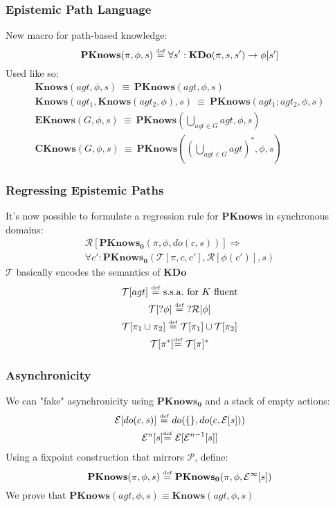 \documentclass{beamer}
\newcommand{\isdef}{\hbox{$\stackrel{\mbox{\tiny def}}{=}$}}
\newcommand{\Reg}{\mathcal{R}}
\newcommand{\Pst}{\mathcal{P}}
\newcommand{\Trn}{\mathcal{T}}
\begin{document}
\begin{frame}
\frametitle{Epistemic Path Language}
New macro for path-based knowledge:
\begin{equation*}
\mathbf{PKnows}(\pi,\phi,s)\ \isdef\ \forall s': \mathbf{KDo}(\pi,s,s') \rightarrow \phi[s']
\end{equation*}
Used like so:
\begin{gather*}
\mathbf{Knows}(agt,\phi,s)\ \equiv\ \mathbf{PKnows}(agt,\phi,s)\\
\mathbf{Knows}(agt_1,\mathbf{Knows}(agt_2,\phi),s)\ \equiv\ \mathbf{PKnows}(agt_1 ; agt_2,\phi,s)\\
\mathbf{EKnows}(G,\phi,s)\ \equiv\ \mathbf{PKnows}(\bigcup_{agt \in G}agt,\phi,s)\\
\mathbf{CKnows}(G,\phi,s)\ \equiv\ \mathbf{PKnows}((\bigcup_{agt \in G}agt)^*,\phi,s)
\end{gather*}
\end{frame}

\begin{frame}
\frametitle{Regressing Epistemic Paths}
It's now possible to formulate a regression rule for $\mathbf{PKnows}$ in synchronous domains:
\begin{multline*}
\Reg[\mathbf{PKnows_0}(\pi,\phi,do(c,s))] \Rightarrow \\
 \forall c': \mathbf{PKnows_0}(\Trn[\pi,c,c'],\Reg[\phi(c')],s)
\end{multline*}
$\mathcal{T}$ basically encodes the semantics of $\mathbf{KDo}$
\begin{gather*}
\mathcal{T}[agt]\ \isdef\ \mathrm{s.s.a.\ for}\ K\ \mathrm{fluent} \\
\mathcal{T}[?\phi]\ \isdef\ ?\mathcal{R}[\phi] \\
\mathcal{T}[\pi_1\cup\pi_2]\ \isdef\ \mathcal{T}[\pi_1]\cup\mathcal{T}[\pi_2] \\
\mathcal{T}[\pi^*] \isdef\ \mathcal{T}[\pi]^*
\end{gather*}
\end{frame}

\begin{frame}
\frametitle{Asynchronicity}
We can "fake" asynchronicity using $\mathbf{PKnows_0}$ and a stack of empty actions:
\begin{gather*}
\mathcal{E}[do(c,s)]\ \isdef\ do(\{\},do(c,\mathcal{E}[s])) \\
\mathcal{E}^n[s] \isdef\ \mathcal{E}[\mathcal{E}^{n-1}[s]]
\end{gather*}
Using a fixpoint construction that mirrors $\Pst$, define:
\begin{equation*}
\mathbf{PKnows}(\pi,\phi,s)\ \isdef\ \mathbf{PKnows_0}(\pi,\phi,\mathcal{E}^{\infty}[s])
\end{equation*}
We prove that $\mathbf{PKnows}(agt,\phi,s) \equiv \mathbf{Knows}(agt,\phi,s)$
\end{frame}
\end{document}

